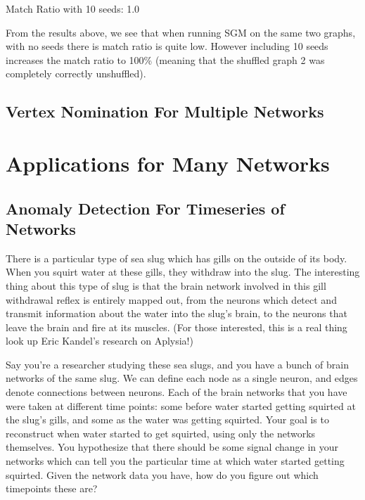 \documentclass[letterpaper,10pt,english]{jupyterBook}
\begin{document}
\begin{sphinxVerbatim}[commandchars=\\\{\}]
Match Ratio with 10 seeds:  1.0
\end{sphinxVerbatim}

\noindent{}

\sphinxAtStartPar
From the results above, we see that when running SGM on the same two graphs, with no seeds there is match ratio is quite low. However including 10 seeds increases the match ratio to 100\% (meaning that the shuffled graph 2 was completely correctly unshuffled).


\section{Vertex Nomination For Multiple Networks}
\label{\detokenize{applications/ch9/multiple-vertex-nomination:vertex-nomination-for-multiple-networks}}\label{\detokenize{applications/ch9/multiple-vertex-nomination::doc}}

\chapter{Applications for Many Networks}
\label{\detokenize{applications/ch10/ch10:applications-for-many-networks}}\label{\detokenize{applications/ch10/ch10::doc}}

\section{Anomaly Detection For Timeseries of Networks}
\label{\detokenize{applications/ch10/anomaly-detection:anomaly-detection-for-timeseries-of-networks}}\label{\detokenize{applications/ch10/anomaly-detection::doc}}
\sphinxAtStartPar
There is a particular type of sea slug which has gills on the outside of its body. When you squirt water at these gills, they withdraw into the slug. The interesting thing about this type of slug is that the brain network involved in this gill withdrawal reflex is entirely mapped out, from the neurons which detect and transmit information about the water into the slug’s brain, to the neurons that leave the brain and fire at its muscles. (For those interested, this is a real thing \sphinxhyphen{} look up Eric Kandel’s research on Aplysia!)

\sphinxAtStartPar
Say you’re a researcher studying these sea slugs, and you have a bunch of brain networks of the same slug. We can define each node as a single neuron, and edges denote connections between neurons. Each of the brain networks that you have were taken at different time points: some before water started getting squirted at the slug’s gills, and some as the water was getting squirted. Your goal is to reconstruct when water started to get squirted, using only the networks themselves. You hypothesize that there should be some signal change in your networks which can tell you the particular time at which water started getting squirted. Given the network data you have, how do you figure out which timepoints these are?
\end{document}
